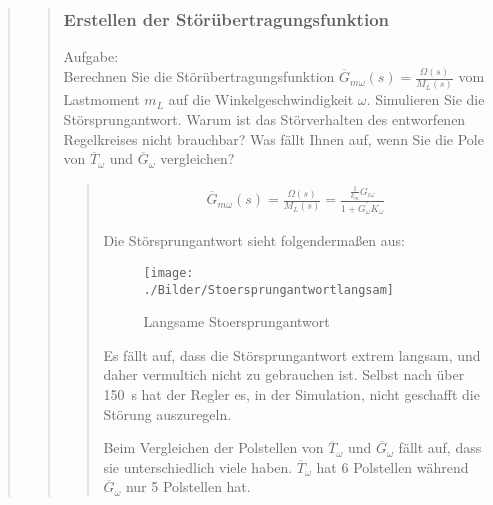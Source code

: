 \begin{quote}
\begin{quote}
        \subsubsection{Erstellen der Störübertragungsfunktion}
        Aufgabe:\\
        Berechnen Sie die Störübertragungsfunktion $\overline{G}_{m\omega} (s) = \frac{\Omega(s)}{M_L (s)}$ vom
        Lastmoment $m_L$ auf die Winkelgeschwindigkeit $\omega$. Simulieren Sie die Störsprungantwort. Warum ist das
        Störverhalten des entworfenen Regelkreises nicht brauchbar? Was fällt Ihnen auf, wenn Sie die Pole von
        $\overline{T}_\omega$ und $\overline{G}_\omega$ vergleichen?
		\begin{quote}
			\begin{equation*}
            	\begin{split}
            		\overline{G}_{m\omega} (s) = \frac{\Omega(s)}{M_L (s)} = \frac{\frac{1}{k_m} G_{i\omega}}{1+ G_\omega^{'} K_\omega}
            	\end{split}
            \end{equation*}
            
            Die Störsprungantwort sieht folgendermaßen aus:
            \begin{figure}[H]
                \centering
                    \texttt{[image: ./Bilder/Stoersprungantwortlangsam]}
                        \caption{Langsame Stoersprungantwort}
                        \label{fig:filename}
            \end{figure}
    
            Es fällt auf, dass die Störsprungantwort extrem langsam, und daher vermultich nicht zu gebrauchen ist. Selbst
            nach über \SI{150}{s} hat der Regler es, in der Simulation, nicht geschafft die Störung auszuregeln.\vspace{1em}
             
            Beim Vergleichen der Polstellen von $\overline{T}_\omega$ und $\overline{G}_\omega$ fällt auf, dass sie
            unterschiedlich viele haben. $\overline{T}_\omega$ hat 6 Polstellen während $\overline{G}_\omega$ nur 5 Polstellen
            hat.
            
		\end{quote}
		

\end{quote}
\end{quote}

